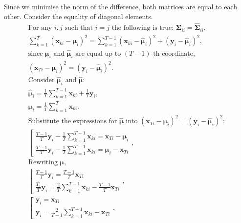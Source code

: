 \documentclass[12pt]{article}
\begin{document}
Since we minimise the norm of the difference, both matrices are equal to each other. Consider the equality of diagonal elements.
\begin{gather*}
	\text{For any } i, j \text{ such that } i = j \text{ the following is true: } \mathbf{\Sigma}_{ii} = \hat{\mathbf{\Sigma}}_{ii},\\
	\sum_{k=1}^{T}(\mathbf{x}_{ki}-\boldsymbol{\mu}_i)^{2} = \sum_{k=1}^{T-1}(\mathbf{x}_{ki} - \hat{\boldsymbol{\mu}}_i)^{2} + (\mathbf{y}_i - \hat{\boldsymbol{\mu}}_i)^{2},\\
	\text{since } \boldsymbol{\mu}_i \text{ and } \hat{\boldsymbol{\mu}}_i \text{ are equal up to } (T-1) \text{-th coordinate,}\\
	(\mathbf{x}_{Ti}-\boldsymbol{\mu}_i)^2 = (\mathbf{y}_i-\hat{\boldsymbol{\mu}}_i)^2.\\
	\text{Consider } \hat{\boldsymbol{\mu}}_i \text{ and } \hat{\boldsymbol{\mu}}:\\
	\hat{\boldsymbol{\mu}}_i = \frac{1}{T}\sum_{k=1}^{T-1}\mathbf{x}_{ki} + \frac{1}{T}\mathbf{y}_i,\\
	\boldsymbol{\mu}_i = \frac{1}{T}\sum_{k=1}^{T}\mathbf{x}_{ki}.\\
	\text{Substitute the expressions for } \hat{\boldsymbol{\mu}} \text{ into } (\mathbf{x}_{Ti}-\boldsymbol{\mu}_i)^2 = (\mathbf{y}_i-\hat{\boldsymbol{\mu}}_i)^2:\\
	\left[
	\begin{array}{ll}
		\frac{T-1}{T}\mathbf{y}_i-\frac{1}{T}\sum_{k=1}^{T-1}\mathbf{x}_{ki}=\mathbf{x}_{Ti}-\boldsymbol{\mu}_i
		\\[1ex]
		\frac{T-1}{T}\mathbf{y}_i-\frac{1}{T}\sum_{k=1}^{T-1}\mathbf{x}_{ki}=\boldsymbol{\mu}_i-\mathbf{x}_{Ti}
	\end{array},
	\right .\\[1ex]
	\text{Rewriting } \boldsymbol{\mu} \text{,}\\
	\left[
	\begin{array}{ll}
		\frac{T-1}{T}\mathbf{y}_i = \frac{T-1}{T}\mathbf{x}_{Ti}
		\\[1ex]
		\frac{T_1}{T}\mathbf{y}_i = \frac{2}{T} \sum_{k=1}^{T-1} \mathbf{x}_{ki} - \frac{T-1}{T}\mathbf{x}_{Ti}
	\end{array},
	\right .\\[1ex]
	\left[
	\begin{array}{ll}
		\mathbf{y}_i = \mathbf{x}_{Ti}
		\\[1ex]
		\mathbf{y}_i = \frac{2}{T-1} \sum_{k=1}^{T-1} \mathbf{x}_{ki} - \mathbf{x}_{Ti}
	\end{array}.
	\right .
\end{gather*}
\end{document}
